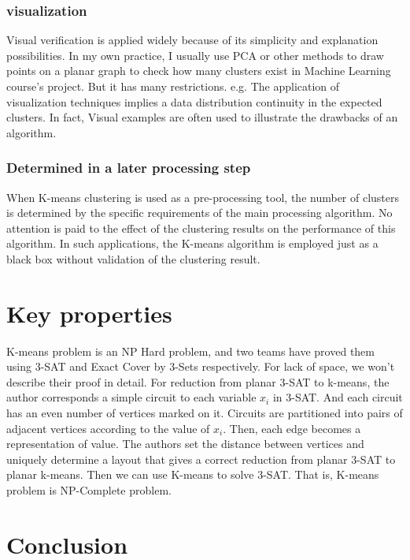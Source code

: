\documentclass[11pt]{article}
\begin{document}
\subsubsection{visualization}
Visual verification is applied widely because of its simplicity and explanation possibilities. In my own practice, I usually use PCA or other methods to draw points on a planar graph to check how many clusters exist in Machine Learning course's project. But it has many restrictions. e.g. The application of
visualization techniques implies a data distribution continuity in the expected clusters. In fact, Visual examples are often used to illustrate the drawbacks of an algorithm. \par

\subsubsection{Determined in a later processing step}
When K-means clustering is used as a pre-processing tool, the number of clusters is determined by the specific requirements of the main processing algorithm. No attention is paid to the effect of the clustering results on the performance of this algorithm. In such applications, the K-means algorithm is employed just as a black box without validation of the clustering result. \par

\section{Key properties}
K-means problem is an NP Hard problem, and two teams have proved them using 3-SAT and Exact Cover by 3-Sets respectively.\cite{npc-prove,Vattani_thehardness}  For lack of space, we won't describe their proof in detail. For reduction from planar 3-SAT to k-means, the author corresponds a simple circuit to each variable $x_i$ in 3-SAT. And each circuit has an even number of vertices marked on it. Circuits are partitioned into pairs of adjacent vertices according to the value of $x_i$. Then, each edge becomes a representation of value. The authors set the distance between vertices and uniquely determine a layout that gives a correct reduction from planar 3-SAT to planar k-means. Then we can use K-means to solve 3-SAT. That is, K-means problem is NP-Complete problem.

\section{Conclusion}
\end{document}
